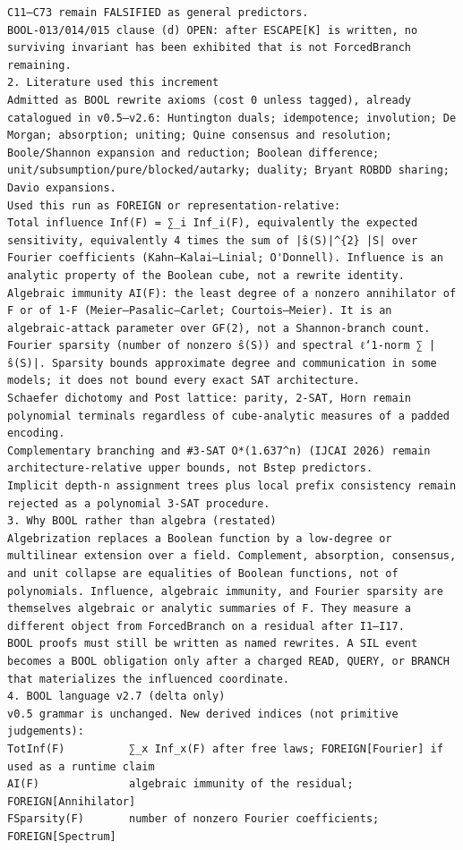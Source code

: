 \documentclass[11pt]{article}
\begin{document}
\begin{Verbatim}[breaklines=true,breakanywhere=true]
C11–C73 remain FALSIFIED as general predictors.
BOOL-013/014/015 clause (d) OPEN: after ESCAPE[K] is written, no surviving invariant has been exhibited that is not ForcedBranch remaining.
2. Literature used this increment
Admitted as BOOL rewrite axioms (cost 0 unless tagged), already catalogued in v0.5–v2.6: Huntington duals; idempotence; involution; De Morgan; absorption; uniting; Quine consensus and resolution; Boole/Shannon expansion and reduction; Boolean difference; unit/subsumption/pure/blocked/autarky; duality; Bryant ROBDD sharing; Davio expansions.
Used this run as FOREIGN or representation-relative:
Total influence Inf(F) = ∑_i Inf_i(F), equivalently the expected sensitivity, equivalently 4 times the sum of |ŝ(S)|^{2} |S| over Fourier coefficients (Kahn–Kalai–Linial; O'Donnell). Influence is an analytic property of the Boolean cube, not a rewrite identity.
Algebraic immunity AI(F): the least degree of a nonzero annihilator of F or of 1-F (Meier–Pasalic–Carlet; Courtois–Meier). It is an algebraic-attack parameter over GF(2), not a Shannon-branch count.
Fourier sparsity (number of nonzero ŝ(S)) and spectral ℓ‘1-norm ∑ |ŝ(S)|. Sparsity bounds approximate degree and communication in some models; it does not bound every exact SAT architecture.
Schaefer dichotomy and Post lattice: parity, 2-SAT, Horn remain polynomial terminals regardless of cube-analytic measures of a padded encoding.
Complementary branching and #3-SAT O*(1.637^n) (IJCAI 2026) remain architecture-relative upper bounds, not Bstep predictors.
Implicit depth-n assignment trees plus local prefix consistency remain rejected as a polynomial 3-SAT procedure.
3. Why BOOL rather than algebra (restated)
Algebrization replaces a Boolean function by a low-degree or multilinear extension over a field. Complement, absorption, consensus, and unit collapse are equalities of Boolean functions, not of polynomials. Influence, algebraic immunity, and Fourier sparsity are themselves algebraic or analytic summaries of F. They measure a different object from ForcedBranch on a residual after I1–I17.
BOOL proofs must still be written as named rewrites. A SIL event becomes a BOOL obligation only after a charged READ, QUERY, or BRANCH that materializes the influenced coordinate.
4. BOOL language v2.7 (delta only)
v0.5 grammar is unchanged. New derived indices (not primitive judgements):
TotInf(F)          ∑_x Inf_x(F) after free laws; FOREIGN[Fourier] if used as a runtime claim
AI(F)              algebraic immunity of the residual; FOREIGN[Annihilator]
FSparsity(F)       number of nonzero Fourier coefficients; FOREIGN[Spectrum]

\end{Verbatim}
\end{document}
